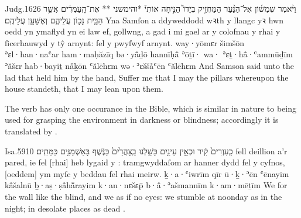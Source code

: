 \begin{example}{Judg.}{16}{26}{}{}
	\quoling
	{וַיֹּ֨אמֶר שִׁמְשׁ֜וֹן אֶל־הַנַּ֨עַר הַמַּחֲזִ֣יק בְּיָדוֹ֮ הַנִּ֣יחָה אוֹתִי֒ *והימשני ** אֶת־הָֽעַמֻּדִ֔ים אֲשֶׁ֥ר הַבַּ֖יִת נָכ֣וֹן עֲלֵיהֶ֑ם וְאֶשָּׁעֵ֖ן עֲלֵיהֶֽם׃}
	{Yna Samſon a ddyweddodd wꝛth y llangc yꝛ hwn oedd yn ymaflyd yn ei law ef, gollwng, a gad i mi gael  ar y colofnau y rhai y ſicerhauwyd y tŷ arnynt: fel y pwyſwyf arnynt.}
	{way·yōmɛr šimšōn ʾɛl·han·naʿar ham·maḥăzīq bə·yå̄ḏō hannīḥå̄ ʾōṯī· wa· ʾɛṯ·hå̄·ʿammūḏīm ʾăšɛr hab·bayiṯ nå̄ḵōn ʿălēhɛm wə·ʾɛššå̄ʿēn ʿălēhɛm}
	{And Samson said unto the lad that held him by the hand, Suffer me that I may  the pillars whereupon the house standeth, that I may lean upon them.}
\end{example}




\begin{paper}
	The verb  has only one occurance in the Bible, which is similar in nature to  being used for grasping the environment in darkness or blindness; accordingly it is translated by .
\end{paper}

\begin{example}{Isa.}{59}{10}{}{}
	\quoling
	{ כַֽעִוְרִים֙ קִ֔יר וּכְאֵ֥ין עֵינַ֖יִם  כָּשַׁ֤לְנוּ בַֽצָּהֳרַ֙יִם֙ כַּנֶּ֔שֶׁף בָּאַשְׁמַנִּ֖ים כַּמֵּתִֽים׃}
	{ fell deillion a’r pared, ie fel [rhai] heb lygaid y  : tramgwyddaſom ar hanner dydd fel y cyfnos, [oeddem] ym myſc y beddau fel rhai meirw.}
	{ ḵ·a·ʿiwrīm qīr ū·ḵ·ʾēn ʿēnayim  kå̄šalnū ḇ·aṣ·ṣå̄hå̄̆rayim k·an·nɛšɛp̄ b·å̄·ʾašmannīm k·am·mēṯīm}
	{We  for the wall like the blind, and we  as if  no eyes: we stumble at noonday as in the night;  in desolate places as dead .}
\end{example}
